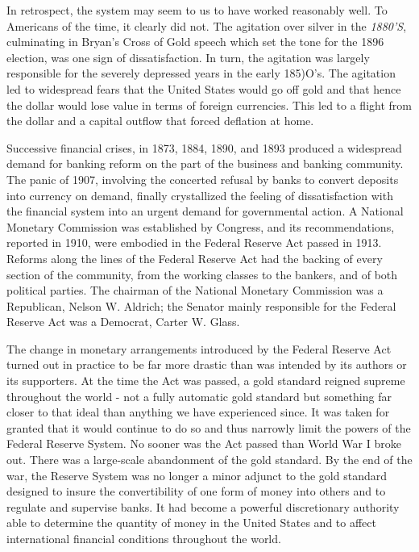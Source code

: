 \documentclass[11pt,openany]{book}
\begin{document}
In retrospect, the system may seem to us to have worked reasonably well. To Americans of the time, it clearly did not. The agitation over silver in the \emph{1880'S}, culminating in Bryan's Cross of Gold speech which set the tone for the 1896 election, was one sign of dissatisfaction. In turn, the agitation was largely responsible for the severely depressed years in the early 185)O's. The agitation led to widespread fears that the United States would go off gold and that hence the dollar would lose value in terms of foreign currencies. This led to a flight from the dollar and a capital outflow that forced deflation at home.

Successive financial crises, in 1873, 1884, 1890, and 1893 produced a widespread demand for banking reform on the part of the business and banking community. The panic of 1907, involving the concerted refusal by banks to convert deposits into currency on demand, finally crystallized the feeling of dissatisfaction with the financial system into an urgent demand for governmental action. A National Monetary Commission was established by Congress, and its recommendations, reported in 1910, were embodied in the Federal Reserve Act passed in 1913. Reforms along the lines of the Federal Reserve Act had the backing of every section of the community, from the working classes to the bankers, and of both political parties. The chairman of the National Monetary Commission was a Republican, Nelson W. Aldrich; the Senator mainly responsible for the Federal Reserve Act was a Democrat, Carter W. Glass.

The change in monetary arrangements introduced by the Federal Reserve Act turned out in practice to be far more drastic than was intended by its authors or its supporters. At the time the Act was passed, a gold standard reigned supreme throughout the world - not a fully automatic gold standard but something far closer to that ideal than anything we have experienced since. It was taken for granted that it would continue to do so and thus narrowly limit the powers of the Federal Reserve System. No sooner was the Act passed than World War I broke out. There was a large-scale abandonment of the gold standard. By the end of the war, the Reserve System was no longer a minor adjunct to the gold standard designed to insure the convertibility of one form of money into others and to regulate and supervise banks. It had become a powerful discretionary authority able to determine the quantity of money in the United States and to affect international financial conditions throughout the world.
\end{document}
